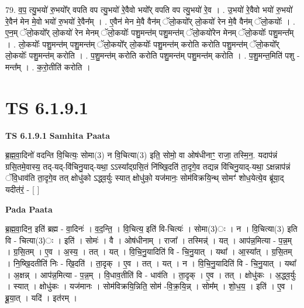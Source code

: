 \documentclass[17pt]{extarticle}
\begin{document}
79. व॒प॒ त्यु॒भयो॑ रु॒भयो᳚र् वपति वप त्यु॒भयो॑ रे॒वैवो भयो᳚र् वपति वप त्यु॒भयो॑ रे॒व । . उ॒भयो॑ रे॒वैवो भयो॑ रु॒भयो॑ रे॒वैन॑ मेन मे॒वो भयो॑ रु॒भयो॑ रे॒वैन᳚म् । . ए॒वैन॑ मेन मे॒वै वैन॑म् ॅलो॒कयो᳚र् लो॒कयो॑ रेन मे॒वै वैन॑म् ॅलो॒कयोः᳚ । . ए॒न॒म् ॅलो॒कयो᳚र् लो॒कयो॑ रेन मेनम् ॅलो॒कयोः᳚ पशु॒मन्त॑म् पशु॒मन्त॑म् ॅलो॒कयो॑रेन मेनम् ॅलो॒कयोः᳚ पशु॒मन्त᳚म् । . लो॒कयोः᳚ पशु॒मन्त॑म् पशु॒मन्त॑म् ॅलो॒कयो᳚र् लो॒कयोः᳚ पशु॒मन्त॑म् करोति करोति पशु॒मन्त॑म् ॅलो॒कयो᳚र् लो॒कयोः᳚ पशु॒मन्त॑म् करोति । . प॒शु॒मन्त॑म् करोति करोति पशु॒मन्त॑म् पशु॒मन्त॑म् करोति । . प॒शु॒मन्त॒मिति॑ पशु - मन्त᳚म् । . क॒रो॒तीति॑ करोति । \newline
\pagebreak
{}

\section{ TS 6.1.9.1 }

\textbf{TS 6.1.9.1 } \newline
\textbf{Samhita Paata} \newline

ब्र॒ह्म॒वा॒दिनो॑ वदन्ति वि॒चित्यः॒ सोमा(3) न वि॒चित्या(3) इति॒ सोमो॒ वा ओष॑धीनाꣳ॒॒ राजा॒ तस्मि॒न॒. यदाप॑न्नं ग्रसि॒तमे॒वास्य॒ तद्-यद्-वि॑चिनु॒याद्-यथा॒ ऽऽस्या᳚द्ग्रसि॒तं नि॑ष्खि॒दति॑ ता॒दृगे॒व तद्यन्न वि॑चिनु॒याद्-यथा॒ ऽक्षन्नाप॑न्नं ॅवि॒धाव॑ति ता॒दृगे॒व तत् क्षोधु॑को ऽद्ध्व॒र्युः स्यात् क्षोधु॑को॒ यज॑मानः॒ सोम॑विक्रयि॒न्थ् सोमꣳ॑ शोध॒येत्ये॒व ब्रू॑या॒द् यदीत॑रं॒ - [  ] \newline

\textbf{Pada Paata} \newline

ब्र॒ह्म॒वा॒दिन॒ इति॑ ब्रह्म - वा॒दिनः॑ । व॒द॒न्ति॒ । वि॒चित्य॒ इति॑ वि-चित्यः॑ । सोमा(3)ः । न । वि॒चित्या(3) इति वि - चित्या(3)ः । इति॑ । सोमः॑ । वै । ओष॑धीनाम् । राजा᳚ । तस्मिन्न्॑ । यत् । आप॑न्न॒मित्या - प॒न्न॒म् । ग्र॒सि॒तम् । ए॒व । अ॒स्य॒ । तत् । यत् । वि॒चि॒नु॒यादिति॑ वि - चि॒नु॒यात् । यथा᳚ । आ॒स्या᳚त् । ग्र॒सि॒तम् । नि॒ष्खि॒दतीति॑ निः -   खि॒दति॑ । ता॒दृक् । ए॒व । तत् । यत् । न । वि॒चि॒नु॒यादिति॑ वि - चि॒नु॒यात् । यथा᳚ । अ॒क्षन्न् । आप॑न्न॒मित्या - प॒न्न॒म् । वि॒धाव॒तीति॑ वि - धाव॑ति । ता॒दृक् । ए॒व । तत् । क्षोधु॑कः । अ॒द्ध्व॒र्युः । स्यात् । क्षोधु॑कः । यज॑मानः । सोम॑विक्रयि॒न्निति॒ सोम॑ -वि॒क्र॒यि॒न्न् । सोम᳚म् । शो॒ध॒य॒ । इति॑ । ए॒व । ब्रू॒या॒त् । यदि॑ । इत॑रम् ।  \newline
\end{document}
